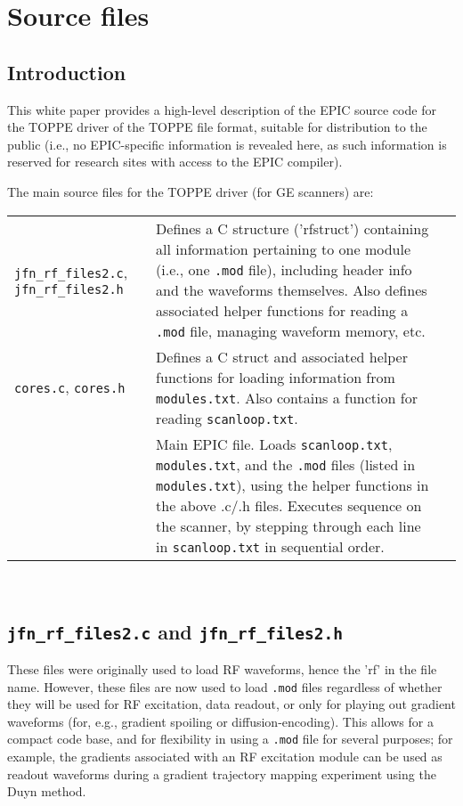 

\chapter{Source files}
\setcounter{page}{1}

\section{Introduction}
This white paper provides a high-level description of the EPIC source code for the TOPPE driver of the TOPPE file format, suitable for distribution to the public (i.e., no EPIC-specific information is revealed here, as such information is reserved for research sites with access to the EPIC compiler).

The main source files for the TOPPE driver (for GE scanners) are: 
\\ [0.1in]
\begin{tabular}{ p{2.5in} p{3.7in} l}
  {\tt jfn\_rf\_files2.c}, {\tt jfn\_rf\_files2.h} & Defines a C structure ('rfstruct') containing all information pertaining to one module (i.e., one {\tt .mod} file), including header info and the waveforms themselves. Also defines associated helper functions for reading a {\tt .mod} file, managing waveform memory, etc. \\
  {\tt cores.c}, {\tt cores.h}  & Defines a C struct and associated helper functions for loading information from {\tt modules.txt}. Also contains a function for reading {\tt scanloop.txt}. \\
  \toppe		& Main EPIC file. Loads {\tt scanloop.txt}, {\tt modules.txt}, and the {\tt .mod} files (listed in {\tt modules.txt}), using the helper functions in the above .c/.h files. Executes sequence on the scanner, by stepping through each line in {\tt scanloop.txt} in sequential order. 
\end{tabular} \\ [0.2in]


\section{{\tt jfn\_rf\_files2.c} and {\tt jfn\_rf\_files2.h}}

These files were originally used to load RF waveforms, hence the 'rf' in the file name.
However, these files are now used to load {\tt .mod} files regardless of whether they will be used for RF excitation, data readout, or only for playing out gradient waveforms (for, e.g., gradient spoiling or diffusion-encoding).
This allows for a compact code base, and for flexibility in using a {\tt .mod} file for several purposes; for example, the gradients associated with an RF excitation module can be used as readout waveforms during a gradient trajectory mapping experiment using the Duyn method.

